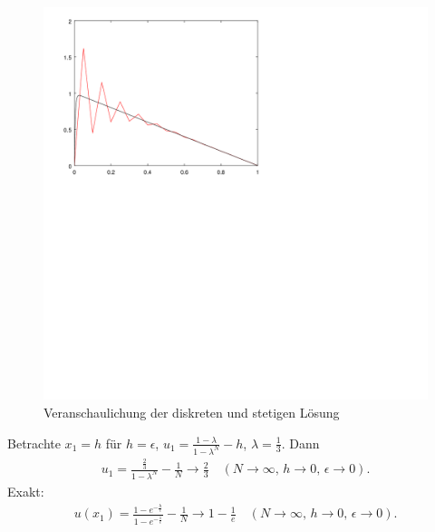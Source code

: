 \begin{enumerate}
\begin{figure}[h!]
  \centering
  \includegraphics[scale=0.6]{1_oscillating.png}
  \caption{Veranschaulichung der diskreten und stetigen Lösung}
  \label{fig:oscillations}
\end{figure}

Betrachte $x_{1} = h$ für $h = \epsilon$, $u_{1} = \frac {1 - \lambda}{1 - \lambda^{N}} - h$, $\lambda = \frac 13$. Dann
\begin{align}
  u_{1} = \frac {\frac 23}{1 - \lambda^{N}} - \frac 1N \to \frac 23 \quad (N \to \infty, \, h \to 0,\,  \epsilon \to 0). 
\end{align}
Exakt:
\begin{align*}
  u(x_{1}) = \frac {1 - e^{ - \frac h \epsilon}}{1 - e^{- \frac 1 \epsilon}} - \frac 1 N \to 1 - \frac 1 e \quad (N \to \infty, \, h \to 0,\,  \epsilon \to 0). 
\end{align*}

\end{enumerate}

